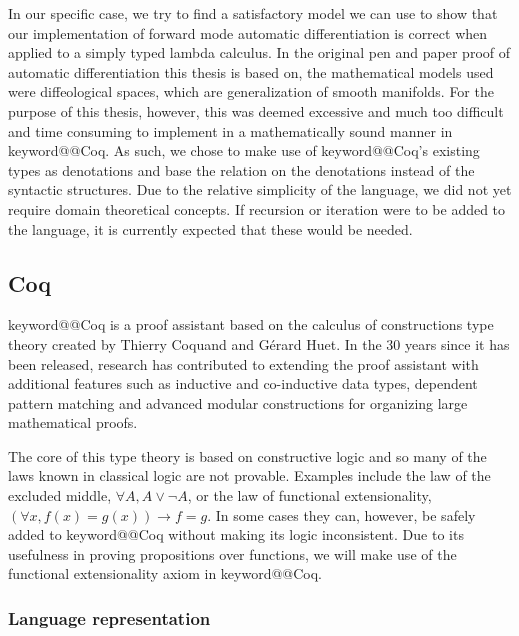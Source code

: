 \documentclass[12pt, final]{article}
\makeatletter
\def\<#1>{\csname keyword@@#1\endcsname}
\makeatother
\begin{document}
In our specific case, we try to find a satisfactory model we can use to show that our implementation of forward mode automatic differentiation is correct when applied to a simply typed lambda calculus.
In the original pen and paper proof of automatic differentiation this thesis is based on, the mathematical models used were diffeological spaces, which are generalization of smooth manifolds.
For the purpose of this thesis, however, this was deemed excessive and much too difficult and time consuming to implement in a mathematically sound manner in \<Coq>.
As such, we chose to make use of \<Coq>'s existing types as denotations and base the relation on the denotations instead of the syntactic structures.
Due to the relative simplicity of the language, we did not yet require domain theoretical concepts. If recursion or iteration were to be added to the language, it is currently expected that these would be needed.


\subsection{Coq}

\<Coq> is a proof assistant based on the calculus of constructions type theory created by Thierry Coquand and G\'{e}rard Huet\cite{Coquand1988}.
In the 30 years since it has been released, research has contributed to extending the proof assistant with additional features such as inductive and co-inductive data types\cite{Coquand1990}, dependent pattern matching\cite{Sozeau2010} and advanced modular constructions for organizing large mathematical proofs\cite{Sozeau2008}\cite{Mahboubi2013}.

The core of this type theory is based on constructive logic and so many of the laws known in classical logic are not provable.
Examples include the law of the excluded middle, $\forall A, A \vee \neg A$, or the law of functional extensionality, $(\forall x, f(x) = g(x)) \rightarrow f = g$.
In some cases they can, however, be safely added to \<Coq> without making its logic inconsistent.
Due to its usefulness in proving propositions over functions, we will make use of the functional extensionality axiom in \<Coq>.

\subsubsection{Language representation}
\label{sec:language_repr}
\end{document}
